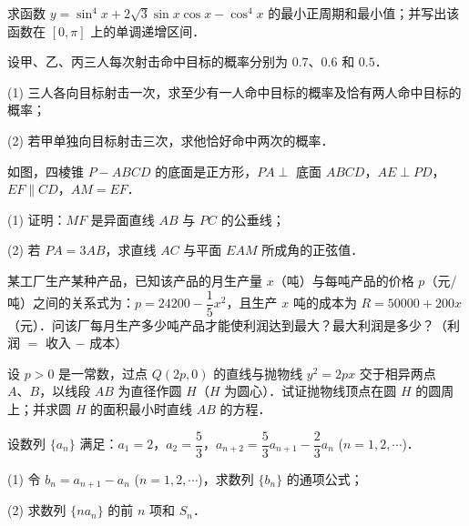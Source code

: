 \begin{question}
求函数 $y = \sin^4 x + 2\sqrt{3} \sin x \cos x - \cos^4 x$ 的最小正周期和最小值；并写出该函数在 $[0, \pi]$ 上的单调递增区间．

\end{question}
\begin{question}
设甲、乙、丙三人每次射击命中目标的概率分别为 $0.7$、$0.6$ 和 $0.5$．

(1) 三人各向目标射击一次，求至少有一人命中目标的概率及恰有两人命中目标的概率；

(2) 若甲单独向目标射击三次，求他恰好命中两次的概率．

\Needspace{0.4\textheight}
\end{question}
\begin{question}
如图，四棱锥 $P - ABCD$ 的底面是正方形，$PA \perp$ 底面 $ABCD$，$AE \perp PD$，$EF \parallel CD$，$AM = EF$．
\nopagebreak[4]
\begin{center}\end{center}
\nopagebreak[4]
(1) 证明：$MF$ 是异面直线 $AB$ 与 $PC$ 的公垂线；

(2) 若 $PA = 3AB$，求直线 $AC$ 与平面 $EAM$ 所成角的正弦值．

\end{question}
\begin{question}
某工厂生产某种产品，已知该产品的月生产量 $x$（吨）与每吨产品的价格 $p$（元/吨）之间的关系式为：$p = 24200 - \dfrac{1}{5}x^2$，且生产 $x$ 吨的成本为 $R = 50000 + 200x$（元）．问该厂每月生产多少吨产品才能使利润达到最大？最大利润是多少？（利润 $=$ 收入 $-$ 成本）

\end{question}
\begin{question}
设 $p > 0$ 是一常数，过点 $Q(2p, 0)$ 的直线与抛物线 $y^2 = 2px$ 交于相异两点 $A\text{、}B$，以线段 $AB$ 为直径作圆 $H$（$H$ 为圆心）．试证抛物线顶点在圆 $H$ 的圆周上；并求圆 $H$ 的面积最小时直线 $AB$ 的方程．

\end{question}
\begin{question}
设数列 $\{a_n\}$ 满足：$a_1 = 2$，$a_2 = \dfrac{5}{3}$，$a_{n+2} = \dfrac{5}{3}a_{n+1} - \dfrac{2}{3}a_n$ ($n = 1, 2, \cdots$)．

(1) 令 $b_n = a_{n+1} - a_n$ ($n = 1, 2, \cdots$)，求数列 $\{b_n\}$ 的通项公式；

(2) 求数列 $\{n a_n\}$ 的前 $n$ 项和 $S_n$．

\end{question}